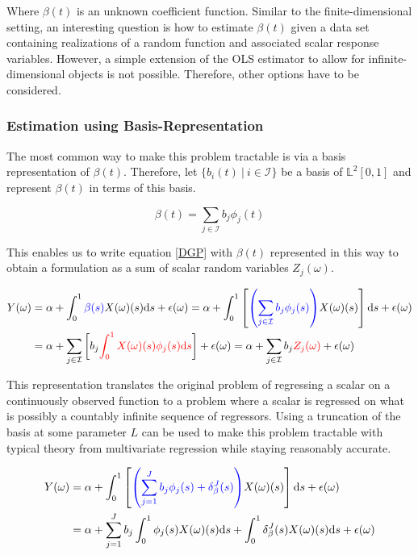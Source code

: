 \documentclass[11pt,twoside,a4paper]{article}
\begin{document}
	Where $\beta(t)$ is an unknown coefficient function. Similar to the finite-dimensional setting, an interesting question is how to estimate $\beta(t)$ given a data set containing realizations of a random function and associated scalar response variables. However, a simple extension of the OLS estimator to allow for infinite-dimensional objects is not possible. Therefore, other options have to be considered.
	
	\subsubsection{Estimation using Basis-Representation}
	The most common way to make this problem tractable is via a basis representation of $\beta(t)$. Therefore, let $\{b_i(t) \: \vert \: i \in \mathcal{I}\}$ be a basis of $\mathbb{L}^2[0,1]$ and represent $\beta(t)$ in terms of this basis.
	
	\begin{equation}
		\beta(t) = \sum_{j \in \mathcal{I}} b_j \phi_j(t)
	\end{equation}
	
	This enables us to write equation \ref{DGP} with $\beta(t)$ represented in this way to obtain a formulation as a sum of scalar random variables $Z_j(\omega)$.
	
	\begin{equation}
		\begin{split}
			Y(\omega) & = \alpha + \int_{0}^{1} {\color{blue}\beta(s)} X(\omega)(s)\mathrm{d}s + \epsilon(\omega)
			= \alpha + \int_{0}^{1}\left[{\color{blue}\left(\sum_{j \in \mathcal{I}} b_j \phi_j(s)\right)} X(\omega)(s) \right]\mathrm{d}s + \epsilon(\omega) \\
			& = \alpha + \sum_{j \in \mathcal{I}} \left[b_j \textcolor{red}{\int_{0}^{1} X(\omega)(s) \phi_j(s)\mathrm{d}s}\right] + \epsilon(\omega)
		      = \alpha + \sum_{j \in \mathcal{I}} b_j \textcolor{red}{Z_j(\omega)} + \epsilon(\omega)
		\end{split}
	\end{equation}
	
	This representation translates the original problem of regressing a scalar on a continuously observed function to a problem where a scalar is regressed on what is possibly a countably infinite sequence of regressors. Using a truncation of the basis at some parameter $L$ can be used to make this problem tractable with typical theory from multivariate regression while staying reasonably accurate.
	
	\begin{equation}
		\begin{split}
			Y(\omega) & = \alpha + \int_{0}^{1}\left[{\color{blue}\left(\sum_{j = 1}^{J} b_j \phi_j(s) + \delta_{\beta}^{J}(s)\right)} X(\omega)(s) \right]\mathrm{d}s + \epsilon(\omega) \\
			& = \alpha + \sum_{j = 1}^{J} b_j \int_{0}^{1} \phi_j(s) X(\omega)(s) \mathrm{d}s +  \int_{0}^{1} \delta_{\beta}^{J}(s) X(\omega)(s) \mathrm{d}s + \epsilon(\omega)
		\end{split}
	\end{equation}
\end{document}

